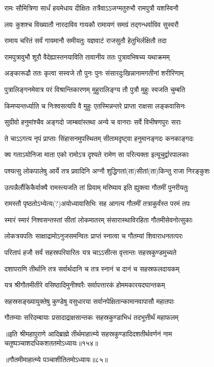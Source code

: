 \twolineshloka
{रामः सौमित्रिणा सार्धं हयमेधाय दीक्षितः}
{तत्रैवाऽऽजग्मतुरुभौ रामपुत्रौ यशस्विनौ} %

\twolineshloka
{लवः कुशश्च विख्यातौ नारदाविव गायकौ}
{रामायणं समग्रं तद्‌गन्धर्वाविव सुस्वरौ} %

\twolineshloka
{रामाय चरितं सर्वं गायमानौ समीयतुः}
{यज्ञवाटं राजसुतौ हेतुभिर्लक्षितौ तदा} %

\twolineshloka
{रामपुत्रावुभौ शूरौ वैदेह्यास्तनयाविति}
{तावानीय ततः पुत्रावभिषच्य यथाक्रमम्} %

\twolineshloka
{अङ्कारूढौ ततः कृत्वा सस्वजे तौ पुनः पुनः}
{संसारदुःखिन्नानामगतीनां शरीरिणाम्} %

\twolineshloka
{पुत्रालिङ्गनमेवात्र परं विश्रान्तिकारणम्}
{मुहुरालिङ्ग्य तौ पुत्रौ मुहुः स्वजति चुम्बति} %

\twolineshloka
{किमप्यन्तर्ध्याति च निःश्वसत्यपि वै मुहुः}
{एतस्मिन्नन्तरे प्राप्ता राक्षसा लङ्कवासिनः} %

\twolineshloka
{सुग्रीवो हनुमांश्चैव अङ्गदो जाम्बवांस्तथा}
{अन्ये च वानराः सर्वे विभीषणपुरः सराः} %

\twolineshloka
{ते चाऽऽगत्य नृपं प्राप्ताः सिंहासनमुपस्थितम्}
{सीतामदृष्ट्वा हनुमानङ्गदः कनकाङ्गदः} %

\twolineshloka
{क्व गताऽयोनिजा माता एको रामोऽत्र दृश्यते}
{रामेण सा परित्यक्ता इत्यूचुर्द्वारपालकाः} %

\twolineshloka
{पश्यत्सु लोकपालेषु आर्ये तत्र प्रवादिनि}
{अग्नौ शुद्धिगतां(ता)सीतां(ता)किन्तु राजा निरङ्कुशः} %

\twolineshloka
{उत्पन्नैर्लौकिकैर्वाक्यै रामस्त्यजति तां प्रियाम्}
{मरिष्याव इति ह्युक्त्वा गौतमीं पुनरीयतुः} %

\twolineshloka
{रामस्तौ पृष्ठतोऽभ्येत्य(?)अयोध्यावासिभिः सह}
{आगत्य गौतमीं तत्राकुर्वंस्त परमं तपः} %

\twolineshloka
{स्मारं स्मारं निश्वसन्तस्तां सीतां लोकमातरम्}
{संसारास्थाविरहिता गौतमीसेवनोत्सुकाः} %

\twolineshloka
{लोकत्रयपतिः साक्षाद्रामोऽनुजसमन्वितः}
{प्राप्तं स्नात्वा च गौतम्यां शिवाराधनतत्परः} %

\twolineshloka
{परितापं हजौ सर्वं सहस्रपरिवारितः}
{यत्र चाऽऽसीत्स वृत्तान्तः सहस्रकुण्डमुच्यते} %

\twolineshloka
{दशापराणि तीर्थानि तत्र सर्वार्थदानि च}
{तत्र स्नानं च दानं च सहस्रफलदायकम्} %

\twolineshloka
{यत्र श्रीगौतमीतीरे वसिष्ठादिमुनीश्वरैः}
{सर्वापत्तारकं होममकारयदघान्तकम्} %

\twolineshloka
{सहस्रसङ्ख्यायुक्तेषु कुण्डेषु वसुधारया}
{सर्वानपेक्षितान्कामानवापासौ महातपाः} %

\twolineshloka
{गौतम्याः सरिदम्बायाः प्रसादाद्राक्षसान्तकः}
{सहस्रकुण्डाभिधं तदभूत्तीर्थं महाफलम्} %

॥इति श्रीमहापुराणे आदिब्राह्मे तीर्थमाहात्म्ये सहस्रकुण्डादिदशतीर्थवर्णनं नाम चतुष्पञ्चाशदधिकशततमोऽध्यायः॥१५४॥

॥गौतमीमाहात्म्ये पञ्चाशीतितमोऽध्यायः॥८५॥